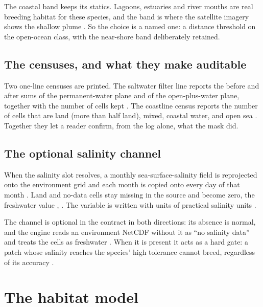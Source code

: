 \documentclass[11pt,a4paper]{article} \usepackage[utf8]{inputenc} \usepackage{lmodern} \usepackage[T1]{fontenc}
\begin{document}
The coastal band keeps its statics. Lagoons, estuaries and river mouths are real breeding
habitat for these species, and the band is where the satellite imagery shows the shallow plume
. So the choice is a named one: a
distance threshold on the open-ocean class, with the near-shore band deliberately retained.

\subsection{The censuses, and what they make auditable}

Two one-line censuses are printed. The saltwater filter line reports the before and after sums
of the permanent-water plane and of the open-plus-water plane, together with the number of cells
kept . The coastline census reports the
number of cells that are land (more than half land), mixed, coastal water, and open sea
. Together they let a reader confirm,
from the log alone, what the mask did.

\subsection{The optional salinity channel}

When the salinity slot resolves, a monthly sea-surface-salinity field is reprojected onto the
environment grid and each month is copied onto every day of that month
. Land and no-data cells stay missing
in the source and become zero, the freshwater value
,
. The variable is written with units of
practical salinity units .

The channel is optional in the contract in both directions: its absence is normal, and the
engine reads an environment NetCDF without it as ``no salinity data'' and treats the cells as
freshwater . When it is present it
acts as a hard gate: a patch whose salinity reaches the species' high tolerance cannot breed,
regardless of its accuracy .

\section{The habitat model} \label{sec:habitat}
\end{document}
